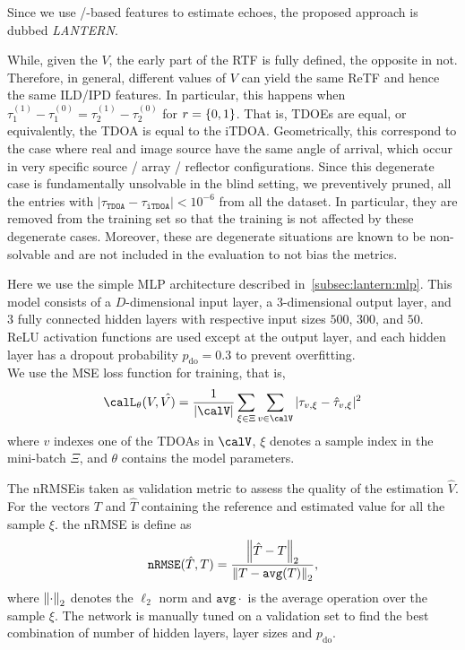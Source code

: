 \mynewline
Since we use \ReTF/-based features to estimate echoes, the proposed approach is dubbed \textit{\acf{LANTERN}}.

\mynewline
While, given the $V$, the early part of the \ac{RTF} is fully defined, the opposite in not.
Therefore, in general, different values of $V$ can yield the same \ac{ReTF} and hence the same \ac{ILD}/\ac{IPD} features.
In particular, this happens when $\tau^{(1)}_1 - \tau^{(0)}_1 = \tau^{(1)}_2 - \tau^{(0)}_2$ for $\idxEch=\set{0,1}$.
That is, \ac{TDOE}s are equal, or equivalently, the \ac{TDOA} is equal to the \ac{iTDOA}.
Geometrically, this correspond to the case where real and image source have the same angle of arrival, which occur in very specific source / array / reflector configurations.
Since this degenerate case is fundamentally unsolvable in the blind setting, we preventively pruned, all the entries with $| \tau_\mathtt{TDOA} - \tau_\mathtt{iTDOA} | < 10^{-6}$ from all the dataset.
In particular, they are removed from the training set so that the training is not affected by these degenerate cases.
Moreover, these are degenerate situations are known to be non-solvable and are not included in the evaluation to not bias the metrics.

\mynewline
Here we use the simple \ac{MLP} architecture described in~\cref{subsec:lantern:mlp}.
This model consists of a $D$-dimensional input layer, a 3-dimensional output layer, and 3 fully connected hidden layers with respective input sizes $500$, $300$, and $50$.
\ac{ReLU} activation functions are used except at the output layer, and each hidden layer has a dropout probability $p_\text{do} = 0.3$ to prevent overfitting.
\\We use the \ac{MSE} loss function for training, that is,
\begin{equation}\label{eq:lantern:mlploss}
    \calL_\theta(V, \hat{V)} = \frac{1}{|\calV|} \sum_{\xi\in\Xi} \sum_{v\in\calV} \powerOf{\tau_{v, \xi} - \hat{\tau}_{v, \xi}}
\end{equation}
where $v$ indexes one of the \acp{TDOA} in $\calV$, $\xi$ denotes a sample index in the mini-batch $\Xi$, and $\theta$ contains the model parameters.

\mynewline
The \acf{nRMSE}is taken as validation metric to assess the quality of the estimation $\hat{V}$.
For the vectors $T$ and $\hat{T}$ containing the reference and estimated value for all the sample $\xi$. the \ac{nRMSE} is define as
\begin{equation*}
    \mathtt{nRMSE}(\hat{T}, T) = \frac{\norm{\hat{T} - T}_2}{\norm{T - \mathtt{avg}(T)}_2}
    ,
\end{equation*}
where $\norm{\cdot}_2$ denotes the $\ell_2$ norm and $\mathtt{avg}{\cdot}$ is the average operation over the sample $\xi$.
The network is manually tuned on a validation set to find the best combination of number of hidden layers, layer sizes and $p_\text{do}$.


